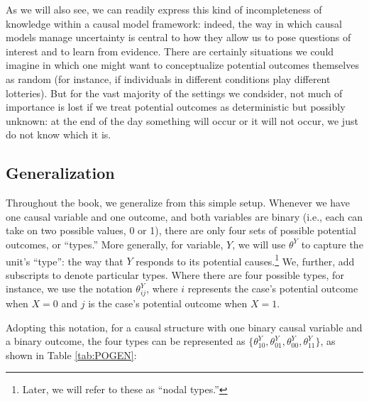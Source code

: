 \documentclass[
  12pt,
]{book}
\begin{document}
As we will also see, we can readily express this kind of incompleteness of knowledge within a causal model framework: indeed, the way in which causal models manage uncertainty is central to how they allow us to pose questions of interest and to learn from evidence. There are certainly situations we could imagine in which one might want to conceptualize potential outcomes themselves as random (for instance, if individuals in different conditions play different lotteries). But for the vast majority of the settings we condsider, not much of importance is lost if we treat potential outcomes as deterministic but possibly unknown: at the end of the day something will occur or it will not occur, we just do not know which it is.

\hypertarget{generalization}{%
\subsection{Generalization}\label{generalization}}

Throughout the book, we generalize from this simple setup. Whenever we have one causal variable and one outcome, and both variables are binary (i.e., each can take on two possible values, 0 or 1), there are only four sets of possible potential outcomes, or ``types.'' More generally, for variable, \(Y\), we will use \(\theta^Y\) to capture the unit's ``type'': the way that \(Y\) responds to its potential causes.\footnote{Later, we will refer to these as ``nodal types.''} We, further, add subscripts to denote particular types. Where there are four possible types, for instance, we use the notation \(\theta^Y_{ij}\), where \(i\) represents the case's potential outcome when \(X=0\) and \(j\) is the case's potential outcome when \(X=1\).

Adopting this notation, for a causal structure with one binary causal variable and a binary outcome, the four types can be represented as \(\{\theta^Y_{10}, \theta^Y_{01}, \theta^Y_{00}, \theta^Y_{11}\}\), as shown in Table \ref{tab:POGEN}:
\end{document}

